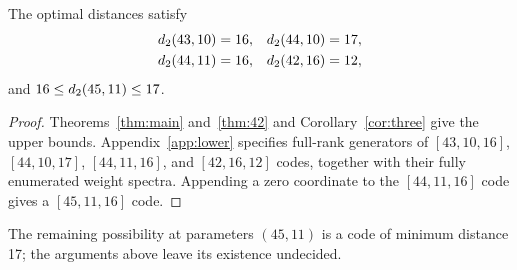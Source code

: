 \begin{corollary}\label{cor:optima}
The optimal distances satisfy
\begin{align*}
 d_2(43,10)&=16,&d_2(44,10)&=17,\\
 d_2(44,11)&=16,&d_2(42,16)&=12,
\end{align*}
and $16\le d_2(45,11)\le17$.
\end{corollary}
\begin{proof}
Theorems~\ref{thm:main} and~\ref{thm:42} and Corollary~\ref{cor:three} give the upper bounds. Appendix~\ref{app:lower} specifies full-rank generators of $[43,10,16]$, $[44,10,17]$, $[44,11,16]$, and $[42,16,12]$ codes, together with their fully enumerated weight spectra. Appending a zero coordinate to the $[44,11,16]$ code gives a $[45,11,16]$ code.
\end{proof}

The remaining possibility at parameters $(45,11)$ is a code of minimum distance 17; the arguments above leave its existence undecided.
